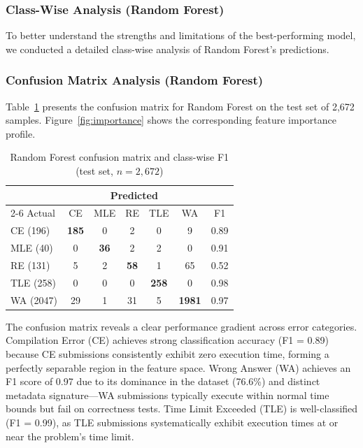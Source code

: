 \documentclass[10pt,a4paper]{article}
\begin{document}
\subsubsection*{Class-Wise Analysis (Random Forest)}

To better understand the strengths and limitations of the best-performing
model, we conducted a detailed class-wise analysis of Random Forest's
predictions.

\subsubsection*{Confusion Matrix Analysis (Random Forest)}

Table~\ref{tab:rf-cm} presents the confusion matrix for Random Forest on the
test set of 2,672 samples. Figure~\ref{fig:importance} shows the corresponding
feature importance profile.

\begin{table}[htbp]
\centering
\caption{Random Forest confusion matrix and class-wise F1
         (test set, $n=2{,}672$)}
\label{tab:rf-cm}
\begin{tabular}{@{}lccccc|c@{}}
\toprule
& \multicolumn{5}{c}{Predicted} & \\
\cmidrule{2-6}
Actual & CE & MLE & RE & TLE & WA & F1 \\
\midrule
CE (196)  & \textbf{185}  & 0   & 2   & 0   & 9   & 0.89 \\
MLE (40)  & 0   & \textbf{36}   & 2   & 2   & 0   & 0.91 \\
RE (131)  & 5   & 2   & \textbf{58} & 1   & 65  & 0.52 \\
TLE (258) & 0   & 0   & 0   & \textbf{258} & 0   & 0.98 \\
WA (2047) & 29  & 1   & 31  & 5   & \textbf{1981} & 0.97 \\
\bottomrule
\end{tabular}
\end{table}

The confusion matrix reveals a clear performance gradient across error
categories. Compilation Error (CE) achieves strong classification accuracy
(F1 = 0.89) because CE submissions consistently exhibit zero execution time,
forming a perfectly separable region in the feature space. Wrong Answer (WA)
achieves an F1 score of 0.97 due to its dominance in the dataset (76.6\%) and
distinct metadata signature---WA submissions typically execute within normal
time bounds but fail on correctness tests. Time Limit Exceeded (TLE) is
well-classified (F1 = 0.99), as TLE submissions systematically exhibit
execution times at or near the problem's time limit.
\end{document}
